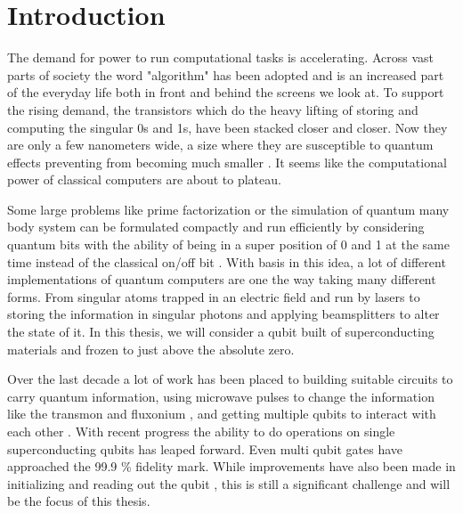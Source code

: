 \chapter{Introduction}\label{chap:Introduction}
The demand for power to run computational tasks is accelerating. Across vast parts of society the word "algorithm" has been adopted and is an increased part of the everyday life both in front and behind the screens we look at. To support the rising demand, the transistors which do the heavy lifting of storing and computing the singular 0s and 1s, have been stacked closer and closer. Now they are only a few nanometers wide, a size where they are susceptible to quantum effects preventing from becoming much smaller \cite{morton_embracing_2011}. It seems like the computational power of classical computers are about to plateau.

Some large problems like prime factorization or the simulation of quantum many body system can be formulated compactly and run efficiently by considering quantum bits with the ability of being in a super position of 0 and 1 at the same time instead of the classical on/off bit \cite{preskill_quantum_2018}. With basis in this idea, a lot of different implementations of quantum computers are one the way taking many different forms. From singular atoms trapped in an electric field and run by lasers \cite{brown_co-designing_2016} to storing the information in singular photons and applying beamsplitters to alter the state of it\cite{obrien_optical_2007}. In this thesis, we will consider a qubit built of superconducting materials and frozen to just above the absolute zero. \cite{krantz_quantum_2019}

Over the last decade a lot of work has been placed to building suitable circuits to carry quantum information\cite{krantz_quantum_2019}, using microwave pulses to change the information like the transmon \cite{koch_charge_2007} and fluxonium \cite{manucharyan_fluxonium_2009}, and getting multiple qubits to interact with each other \cite{yan_tunable_2018}. With recent progress the ability to do operations on single superconducting qubits \cite{barends_superconducting_2014} has leaped forward. Even multi qubit gates have approached the 99.9 \% fidelity mark\cite{ding_high-fidelity_2023}. While improvements have also been made in initializing and reading out the qubit \cite{walter_rapid_2017, swiadek_enhancing_2023}, this is still a  significant challenge and will be the focus of this thesis.

